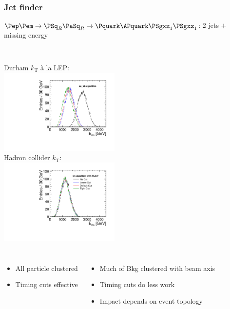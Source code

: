 \documentclass{beamer}
\begin{document}
\begin{frame}
\frametitle{Jet finder}
$\Pep\Pem\to\PSq_R\PaSq_R\to\Pquark\APquark\PSgxz_1 \PSgxz_1$: 2 jets $+$
missing energy\\ ~\\
\begin{columns}[c]
\column{6cm}
Durham $k_{\textrm{T}}$ \`a la LEP:\\
\includegraphics[width=6cm]{../SIDWorkshop/JetFinding_compare_E_vis__FJ_ee_kt_algorithm_ExclusiveNJets_2.pdf}\\
\column{6cm}
Hadron collider $k_{\textrm{T}}$:\\
\includegraphics[width=6cm]{../SIDWorkshop/JetFinding_compare_E_vis__FJ_kt_algorithm_0_7_ExclusiveNJets_2.pdf}\\
\end{columns}
\begin{columns}
\column{6cm}
{\scriptsize
\begin{itemize}
  \item All particle clustered
  \item Timing cuts effective
\end{itemize}
}
\column{6cm}
{\scriptsize
\begin{itemize}
  \item Much of Bkg clustered with beam axis
  \item Timing cuts do less work
  \item Impact depends on event topology
\end{itemize}
}
\end{columns}
\end{frame}
\end{document}
